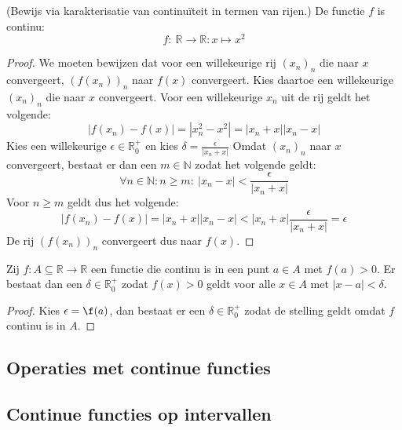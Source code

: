 \documentclass[main.tex]{subfiles}
\begin{document}
\begin{vb}
  (Bewijs via karakterisatie van continu\"iteit in termen van rijen.)
  De functie $f$ is continu:
  \[ f:\ \mathbb{R} \rightarrow \mathbb{R}: x \mapsto x^{2} \]
  
  \begin{proof}
    We moeten bewijzen dat voor een willekeurige rij $(x_{n})_{n}$ die naar $x$ convergeert, $(f(x_{n}))_{n}$ naar $f(x)$ convergeert.
    Kies daartoe een willekeurige $(x_{n})_{n}$ die naar $x$ convergeert.
    Voor een willekeurige $x_{n}$ uit de rij geldt het volgende:
    \[ |f(x_{n})-f(x)| = |x_{n}^{2}-x^{2}| = |x_{n}+x||x_{n}-x| \]
    Kies een willekeurige $\epsilon \in \mathbb{R}_{0}^{+}$ en kies $\delta = \frac{\epsilon}{|x_{n}+x|}$
    Omdat $(x_{n})_{n}$ naar $x$ convergeert, bestaat er dan een $m\in \mathbb{N}$ zodat het volgende geldt:
    \[ \forall n\in \mathbb{N}: n \ge m:\ |x_{n}-x| < \frac{\epsilon}{|x_{n}+x|} \]
    Voor $n \ge m$ geldt dus het volgende:
    \[ |f(x_{n})-f(x)| = |x_{n}+x||x_{n}-x| < |x_{n}+x|\frac{\epsilon}{|x_{n}+x|} = \epsilon \]
    De rij $(f(x_{n}))_{n}$ convergeert dus naar $f(x)$.
  \end{proof}
\end{vb}

\begin{vb}
  Zij $f: A \subseteq \mathbb{R} \rightarrow \mathbb{R}$ een functie die continu is in een punt $a\in A$ met $f(a) > 0$.
  Er bestaat dan een $\delta \in \mathbb{R}_{0}^{+}$ zodat $f(x)>0$ geldt voor alle $x\in A$ met $|x-a| < \delta$.

  \begin{proof}
    Kies $\epsilon = \f(a)$, dan bestaat er een $\delta \in \mathbb{R}_{0}^{+}$ zodat de stelling geldt omdat $f$ continu is in $A$.
  \end{proof}
\end{vb}

\subsection{Operaties met continue functies}
\label{sec:oper-met-cont}



\subsection{Continue functies op intervallen}
\label{sec:continue-functies-op}

\end{document}
